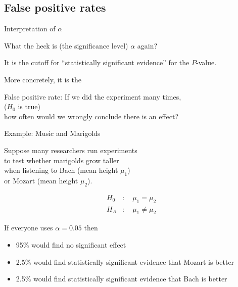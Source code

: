 \subsection{False positive rates}
\begin{frame}{Interpretation of $\alpha$}

  What the heck is (the significance level) $\alpha$ again?

  \vspace{2em}
  \pause

  It is the \alert{cutoff} for ``statistically significant evidence''
  for the $P$-value.

    \vspace{2em}

    More concretely, it is the 
  \begin{block}{False positive rate:}
    If we did the experiment many times,\\
     ($H_0$ is true)\\
    how often would we \alert{wrongly} conclude there is an effect?
  \end{block}

\end{frame}



\begin{frame}{Example: Music and Marigolds}

    Suppose many researchers run experiments\\
    to test whether marigolds grow taller \\
    when listening to Bach (mean height $\mu_1$) \\
    or Mozart (mean height $\mu_2$). 


    \vspace{2em}

    \begin{align*}
        H_0 &: \quad \mu_1 = \mu_2  \\
        H_A &: \quad \mu_1 \neq \mu_2 
    \end{align*}

    \vspace{2em}

    If everyone uses $\alpha=0.05$ then
    \begin{itemize}
        \item 95\% would find no significant effect
        \item 2.5\% would find statistically significant evidence that Mozart is better
        \item 2.5\% would find statistically significant evidence that Bach is better
    \end{itemize}

\end{frame}

